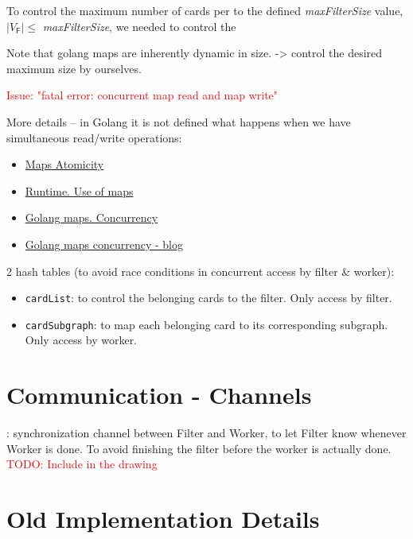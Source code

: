     To control the maximum number of cards per \filter to the defined \emph{maxFilterSize} value, $|V_{\mathsf{F}}| \leq $ \emph{maxFilterSize}, we needed to control the 
    
    Note that golang maps are inherently dynamic in size. -> control the desired maximum size by ourselves. 

    \textcolor{red}{Issue: "fatal error: concurrent map read and map write"}

    More details -- in Golang it is not defined what happens when we have simultaneous read/write operations:

    \begin{itemize}
      \item \href{https://go.dev/doc/faq#atomic_maps}{Maps Atomicity}
      \item \href{https://go.dev/doc/go1.6}{Runtime. Use of maps}
      \item \href{https://go.dev/blog/maps}{Golang maps. Concurrency}
      \item \href{https://groups.google.com/g/golang-nuts/c/_XHqFejikBg?pli=1}{Golang maps concurrency - blog}
    \end{itemize}

    2 hash tables (to avoid race conditions in concurrent access by filter \& worker):
    \begin{itemize}
      \item \texttt{cardList}: to control the belonging cards to the filter. Only access by filter.
      \item \texttt{cardSubgraph}: to map each belonging card to its corresponding subgraph. Only access by worker.
    \end{itemize}

\section{Communication - Channels}

\item {}: synchronization channel between Filter and Worker, to let Filter know whenever Worker is done. To avoid finishing the filter before the worker is actually done. \textcolor{red}{TODO: Include in the drawing}

\section{Old Implementation Details}


